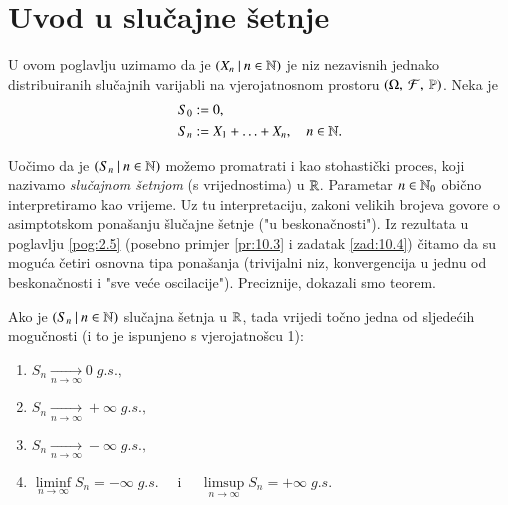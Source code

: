 
\chapter{Uvod u slu\v cajne \v setnje}

U ovom poglavlju uzimamo da je $({X_n} \: | \: {n \in \mathbb{N}})$ je niz nezavisnih jednako distribuiranih slu\v cajnih varijabli na vjerojatnosnom prostoru $(\Omega, \: \mathcal{F}, \: \mathbb{P})$.
Neka je
\begin{equation*}
    \begin{aligned}
        S_0 &:= 0,\\
        S_n &:= X_1 + \ldots + X_n, \quad n \in \mathbb{N}.
    \end{aligned}
\end{equation*}

Uo\v cimo da je $({S_n} \: | \: {n \in \mathbb{N}})$ mo\v zemo promatrati i kao stohasti\v cki proces, koji nazivamo \emph{slu\v cajnom \v setnjom} (s vrijednostima) u $\mathbb{R}$.
Parametar $n \in \mathbb{N}_0$ obi\v cno interpretiramo kao vrijeme.
Uz tu interpretaciju, zakoni velikih brojeva govore o asimptotskom pona\v sanju \v slu\v cajne \v setnje ("u beskona\v cnosti").
Iz rezultata u poglavlju \ref{pog:2.5} (posebno primjer \ref{pr:10.3} i zadatak \ref{zad:10.4}) \v citamo da su mogu\' ca \v cetiri osnovna tipa pona\v sanja (trivijalni niz, konvergencija u jednu od beskona\v cnosti i "sve ve\' ce oscilacije").
Preciznije, dokazali smo teorem.

\begin{tm}  \label{tm:15.1}
    Ako je $({S_n} \: | \: {n \in \mathbb{N}})$ slu\v cajna \v setnja u $\mathbb{R}$, tada vrijedi to\v cno jedna od sljede\' cih mogu\v cnosti (i to je ispunjeno s vjerojatno\v scu 1):
    \begin{enumerate}[label=(\roman*)]
        \item $S_n \xrightarrow[n \to \infty]{} 0 \; g.s.,$
        \item $S_n \xrightarrow[n \to \infty]{} +\infty \; g.s.,$
        \item $S_n \xrightarrow[n \to \infty]{} -\infty \; g.s.,$
        \item $\liminf\limits_{n \to \infty} S_n = - \infty \; g.s. \quad$ i $\quad \limsup\limits_{n \to \infty} S_n = + \infty \; g.s.$
    \end{enumerate}
\end{tm}